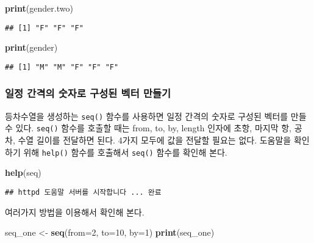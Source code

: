 \documentclass[
]{article}
\newenvironment{Shaded}{\begin{snugshade}}{\end{snugshade}}
\newcommand{\AttributeTok}[1]{\textcolor[rgb]{0.13,0.29,0.53}{#1}}
\newcommand{\DecValTok}[1]{\textcolor[rgb]{0.00,0.00,0.81}{#1}}
\newcommand{\FunctionTok}[1]{\textcolor[rgb]{0.13,0.29,0.53}{\textbf{#1}}}
\newcommand{\NormalTok}[1]{#1}
\newcommand{\OtherTok}[1]{\textcolor[rgb]{0.56,0.35,0.01}{#1}}
\begin{document}
\begin{Shaded}
\begin{Highlighting}[]
\FunctionTok{print}\NormalTok{(gender.two)}
\end{Highlighting}
\end{Shaded}

\begin{verbatim}
## [1] "F" "F" "F"
\end{verbatim}

\begin{Shaded}
\begin{Highlighting}[]
\FunctionTok{print}\NormalTok{(gender)}
\end{Highlighting}
\end{Shaded}

\begin{verbatim}
## [1] "M" "M" "F" "F" "F"
\end{verbatim}

\hypertarget{uxc77cuxc815-uxac04uxaca9uxc758-uxc22buxc790uxb85c-uxad6cuxc131uxb41c-uxbca1uxd130-uxb9ccuxb4e4uxae30}{%
\subsubsection{일정 간격의 숫자로 구성된 벡터
만들기}\label{uxc77cuxc815-uxac04uxaca9uxc758-uxc22buxc790uxb85c-uxad6cuxc131uxb41c-uxbca1uxd130-uxb9ccuxb4e4uxae30}}

등차수열을 생성하는 \texttt{seq()} 함수를 사용하면 일정 간격의 숫자로
구성된 벡터를 만들 수 있다. \texttt{seq()} 함수를 호출할 때는 from, to,
by, length 인자에 초항, 마지막 항, 공차, 수열 길이를 전달하면 된다.
4가지 모두에 값을 전달할 필요는 없다. 도움말을 확인하기 위해
\texttt{help()} 함수를 호출해서 \texttt{seq()} 함수를 확인해 본다.

\begin{Shaded}
\begin{Highlighting}[]
\FunctionTok{help}\NormalTok{(seq)}
\end{Highlighting}
\end{Shaded}

\begin{verbatim}
## httpd 도움말 서버를 시작합니다 ... 완료
\end{verbatim}

여러가지 방법을 이용해서 확인해 본다.

\begin{Shaded}
\begin{Highlighting}[]
\NormalTok{seq\_one }\OtherTok{\textless{}{-}} \FunctionTok{seq}\NormalTok{(}\AttributeTok{from=}\DecValTok{2}\NormalTok{, }\AttributeTok{to=}\DecValTok{10}\NormalTok{, }\AttributeTok{by=}\DecValTok{1}\NormalTok{)}
\FunctionTok{print}\NormalTok{(seq\_one)}
\end{Highlighting}
\end{Shaded}
\end{document}
